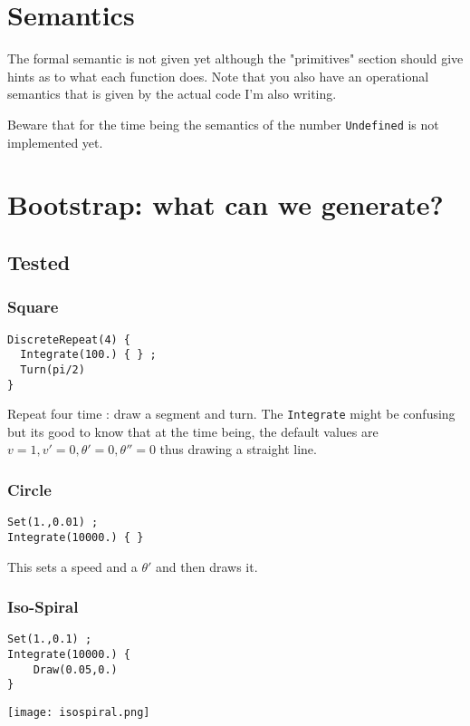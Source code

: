 \documentclass[hidelinks,10pt]{article}
\begin{document}
\section{Semantics}

    The formal semantic is not given yet although the "primitives" section
    should give hints as to what each function does. Note that you also have an
    operational semantics that is given by the actual code I'm also writing.

    Beware that for the time being the semantics of the number
    \texttt{Undefined} is not implemented yet.

\section{Bootstrap: what can we generate?}

\subsection{Tested}

\subsubsection{Square}

\begin{verbatim}
DiscreteRepeat(4) {
  Integrate(100.) { } ;
  Turn(pi/2)
}
\end{verbatim}

Repeat four time : draw a segment and turn.
The \texttt{Integrate} might be confusing but its good to know that at the time
being, the default values are $v=1, v'=0, \theta'=0,\theta''=0$ thus drawing a
straight line.

\subsubsection{Circle}
\begin{verbatim}
Set(1.,0.01) ;
Integrate(10000.) { }
\end{verbatim}

This sets a speed and a $\theta'$ and then draws it.

\subsubsection{Iso-Spiral}
\begin{verbatim}
Set(1.,0.1) ;
Integrate(10000.) {
    Draw(0.05,0.)
}
\end{verbatim}
\texttt{[image: isospiral.png]}
\end{document}
